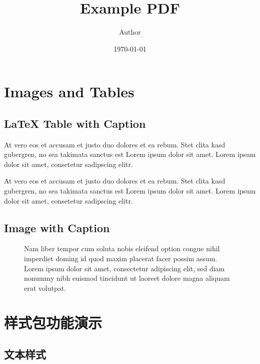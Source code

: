 \documentclass[11pt,a4paper]{article}
\title{Example PDF}
\author{Author}
\date{\today}
\begin{document}
\maketitle
\thispagestyle{fancy}

\tableofcontents
\newpage

\section{Images and Tables}

\subsection{LaTeX Table with Caption}

At vero eos et accusam et justo duo dolores et ea rebum. Stet clita kasd gubergren, no sea takimata sanctus est Lorem ipsum dolor sit amet. Lorem ipsum dolor sit amet, consetetur sadipscing elitr.



At vero eos et accusam et justo duo dolores et ea rebum. Stet clita kasd gubergren, no sea takimata sanctus est Lorem ipsum dolor sit amet. Lorem ipsum dolor sit amet, consetetur sadipscing elitr.

\subsection{Image with Caption}

\begin{figure}[H]
    \centering
    \caption{Nam liber tempor cum soluta nobis eleifend option congue nihil imperdiet doming id quod maxim placerat facer possim assum. Lorem ipsum dolor sit amet, consectetur adipiscing elit, sed diam nonummy nibh euismod tincidunt ut laoreet dolore magna aliquam erat volutpat.}
    \label{fig:example}
\end{figure}

\section{样式包功能演示}

\subsection{文本样式}
\end{document}
